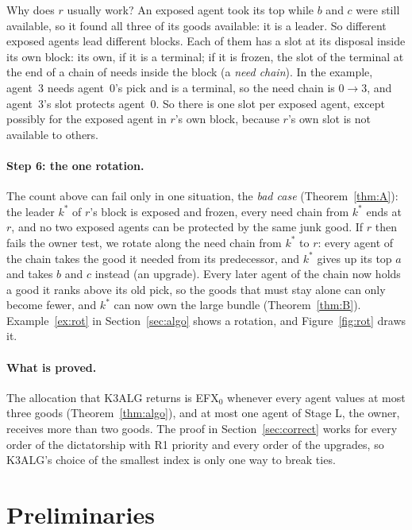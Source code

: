 \documentclass[runningheads,11pt]{llncs}
\newcommand{\efxz}{\texorpdfstring{\mbox{EFX$_0$}}{EFX0}}
\begin{document}
Why does $r$ usually work? An exposed agent took its top while $b$ and $c$ were still available, so it found all three of its goods available: it is a leader. So different exposed agents lead different blocks. Each of them has a slot at its disposal inside its own block: its own, if it is a terminal; if it is frozen, the slot of the terminal at the end of a chain of needs inside the block (a \emph{need chain}). In the example, agent~$3$ needs agent~$0$'s pick and is a terminal, so the need chain is $0\to3$, and agent~$3$'s slot protects agent~$0$. So there is one slot per exposed agent, except possibly for the exposed agent in $r$'s own block, because $r$'s own slot is not available to others.

\paragraph{Step 6: the one rotation.} The count above can fail only in one situation, the \emph{bad case} (Theorem~\ref{thm:A}): the leader $k^*$ of $r$'s block is exposed and frozen, every need chain from $k^*$ ends at $r$, and no two exposed agents can be protected by the same junk good. If $r$ then fails the owner test, we rotate along the need chain from $k^*$ to $r$: every agent of the chain takes the good it needed from its predecessor, and $k^*$ gives up its top $a$ and takes $b$ and $c$ instead (an upgrade). Every later agent of the chain now holds a good it ranks above its old pick, so the goods that must stay alone can only become fewer, and $k^*$ can now own the large bundle (Theorem~\ref{thm:B}). Example~\ref{ex:rot} in Section~\ref{sec:algo} shows a rotation, and Figure~\ref{fig:rot} draws it.

\paragraph{What is proved.} The allocation that K3ALG returns is \efxz{} whenever every agent values at most three goods (Theorem~\ref{thm:algo}), and at most one agent of Stage L, the owner, receives more than two goods. The proof in Section~\ref{sec:correct} works for every order of the dictatorship with R1 priority and every order of the upgrades, so K3ALG's choice of the smallest index is only one way to break ties.

\section{Preliminaries}\label{sec:prelim}
\end{document}
